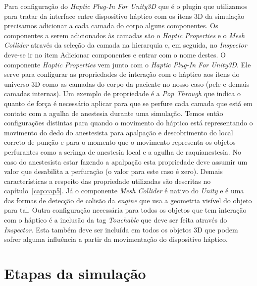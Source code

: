 Para configuração do \textit{Haptic Plug-In For Unity3D} \cite{Poyade2014} que é o plugin que utilizamos para tratar da interface entre dispositivo háptico com os itens 3D da simulação precisamos adicionar a cada camada do corpo alguns componentes. Os componentes a serem adicionados às camadas são o \textit{Haptic Properties} e o \textit{Mesh Collider} através da seleção da camada na hierarquia e, em seguida, no \textit{Inspector} deve-se ir no item Adicionar componentes e entrar com o nome destes. O componente \textit{Haptic Properties} vem junto com o \textit{Haptic Plug-In For Unity3D}. Ele serve para configurar as propriedades de interação com o háptico aos itens do universo 3D como as camadas do corpo da paciente no nosso caso (pele e demais camadas internas). Um exemplo de propriedade é a \textit{Pop Through} que indica o quanto de força é necessário aplicar para que se perfure cada camada que está em contato com a agulha de anestesia durante uma simulação. Temos então configurações distintas para quando o movimento do háptico está representando o movimento do dedo do anestesista para apalpação e descobrimento do local correto de punção e para o momento que o movimento representa os objetos perfurantes como a seringa de anestesia local e a agulha de raquianestesia. No caso do anestesista estar fazendo a apalpação esta propriedade deve assumir um valor que desabilita a perfuração (o valor para este caso é zero). Demais características a respeito das propriedade utilizadas são descritas no capítulo~\ref{cap:cap5}. Já o componente \textit{Mesh Collider} é nativo do \textit{Unity} e é uma das formas de detecção de colisão da \textit{engine} que usa a geometria visível do objeto para tal. Outra configuração necessária para todos os objetos que tem interação com o háptico é a inclusão  da tag \textit{Touchable} que deve ser feita através do \textit{Inspector}. Esta também deve ser incluída em todos os objetos 3D que podem sofrer alguma influência a partir da movimentação do dispositivo háptico.


\section {Etapas da simulação}

